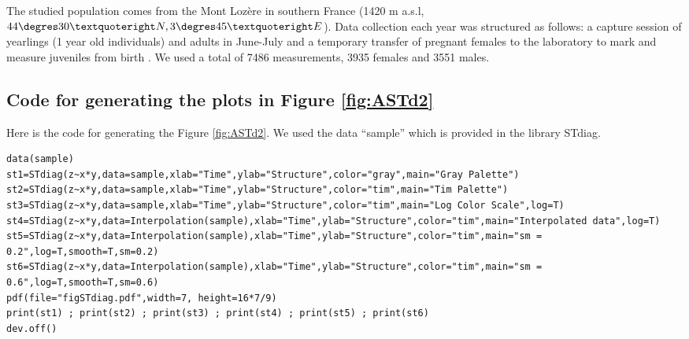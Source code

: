 The studied population comes from the Mont Lozère in southern France (1420 m
a.s.l, $44\degres 30’N, 3 \degres 45’E$). Data collection each year was
structured as follows:
a capture session of yearlings (1 year old individuals) and adults in June-July
and a temporary transfer of pregnant females to the laboratory to mark and
measure juveniles from birth \autocites{le-galliard2010a}.
We used a total of 7486 measurements, 3935 females and 3551 males.

\subsection{Code for generating the plots in Figure \ref{fig:ASTd2}}

Here is the code for generating the Figure \ref{fig:ASTd2}. We used the data
“sample” which is provided in the library STdiag.
\begin{verbatim}
data(sample)
st1=STdiag(z~x*y,data=sample,xlab="Time",ylab="Structure",color="gray",main="Gray Palette")
st2=STdiag(z~x*y,data=sample,xlab="Time",ylab="Structure",color="tim",main="Tim Palette")
st3=STdiag(z~x*y,data=sample,xlab="Time",ylab="Structure",color="tim",main="Log Color Scale",log=T)
st4=STdiag(z~x*y,data=Interpolation(sample),xlab="Time",ylab="Structure",color="tim",main="Interpolated data",log=T)
st5=STdiag(z~x*y,data=Interpolation(sample),xlab="Time",ylab="Structure",color="tim",main="sm = 0.2",log=T,smooth=T,sm=0.2)
st6=STdiag(z~x*y,data=Interpolation(sample),xlab="Time",ylab="Structure",color="tim",main="sm = 0.6",log=T,smooth=T,sm=0.6)
pdf(file="figSTdiag.pdf",width=7, height=16*7/9)
print(st1) ; print(st2) ; print(st3) ; print(st4) ; print(st5) ; print(st6)
dev.off()
\end{verbatim}